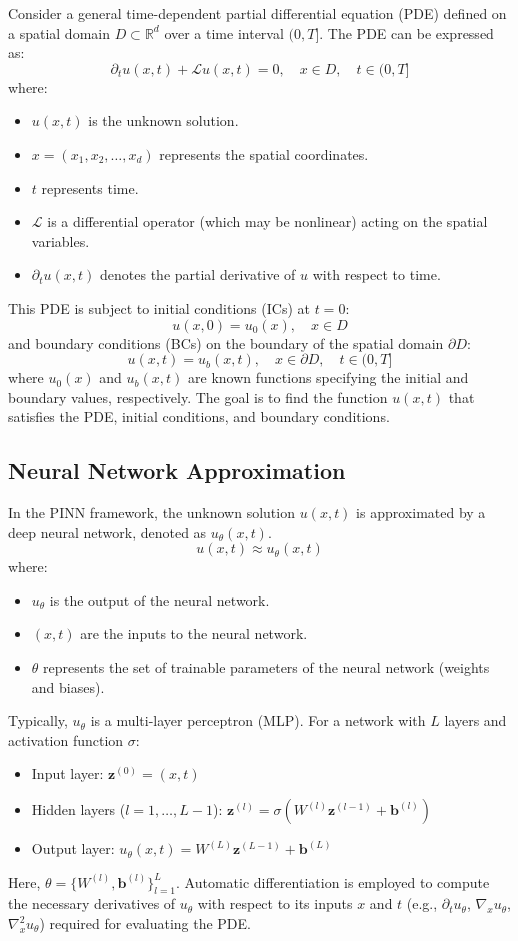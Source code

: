\documentclass[11pt,twoside,openright]{report}
\begin{document}
Consider a general time-dependent partial differential equation (PDE) defined on a spatial domain $D \subset \mathbb{R}^d$ over a time interval $(0, T]$. The PDE can be expressed as:
$$
\partial_t u(x, t) + \mathcal{L}u(x, t) = 0, \quad x \in D, \quad t \in (0, T]
$$
where:
\begin{itemize}
    \item $u(x, t)$ is the unknown solution.
    \item $x = (x_1, x_2, \dots, x_d)$ represents the spatial coordinates.
    \item $t$ represents time.
    \item $\mathcal{L}$ is a differential operator (which may be nonlinear) acting on the spatial variables.
    \item $\partial_t u(x, t)$ denotes the partial derivative of $u$ with respect to time.
\end{itemize}

This PDE is subject to initial conditions (ICs) at $t=0$:
$$
u(x, 0) = u_0(x), \quad x \in D
$$
and boundary conditions (BCs) on the boundary of the spatial domain $\partial D$:
$$
u(x, t) = u_b(x, t), \quad x \in \partial D, \quad t \in (0, T]
$$
where $u_0(x)$ and $u_b(x, t)$ are known functions specifying the initial and boundary values, respectively. The goal is to find the function $u(x, t)$ that satisfies the PDE, initial conditions, and boundary conditions.

\subsection{Neural Network Approximation}

In the PINN framework, the unknown solution $u(x, t)$ is approximated by a deep neural network, denoted as $u_{\theta}(x, t)$.
$$
u(x, t) \approx u_{\theta}(x, t)
$$
where:
\begin{itemize}
    \item $u_{\theta}$ is the output of the neural network.
    \item $(x, t)$ are the inputs to the neural network.
    \item $\theta$ represents the set of trainable parameters of the neural network (weights and biases).
\end{itemize}
Typically, $u_{\theta}$ is a multi-layer perceptron (MLP). For a network with $L$ layers and activation function $\sigma$:
\begin{itemize}
    \item Input layer: $\mathbf{z}^{(0)} = (x, t)$
    \item Hidden layers ($l=1, \dots, L-1$): $\mathbf{z}^{(l)} = \sigma(W^{(l)}\mathbf{z}^{(l-1)} + \mathbf{b}^{(l)})$
    \item Output layer: $u_{\theta}(x, t) = W^{(L)}\mathbf{z}^{(L-1)} + \mathbf{b}^{(L)}$
\end{itemize}
Here, $\theta = \{W^{(l)}, \mathbf{b}^{(l)}\}_{l=1}^L$. Automatic differentiation is employed to compute the necessary derivatives of $u_{\theta}$ with respect to its inputs $x$ and $t$ (e.g., $\partial_t u_{\theta}$, $\nabla_x u_{\theta}$, $\nabla_x^2 u_{\theta}$) required for evaluating the PDE.
\end{document}
